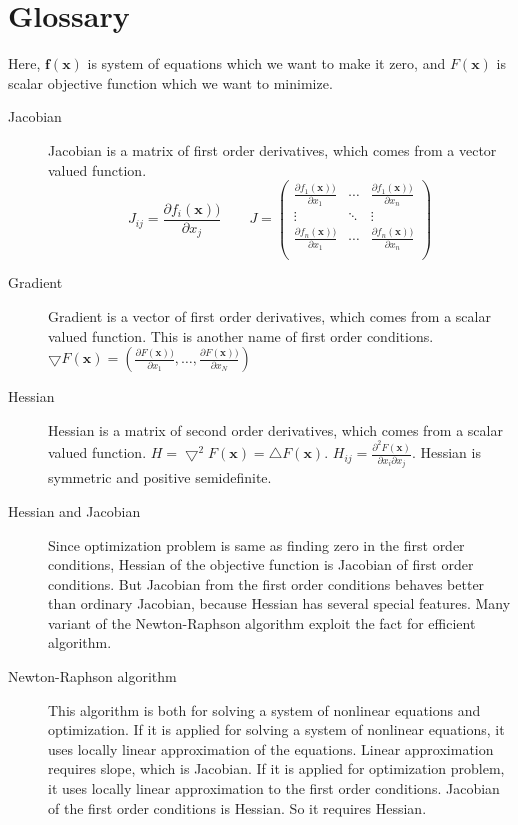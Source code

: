 \documentclass[12pt]{article}
\def\pdiff#1#2{\frac{\partial #1}{\partial #2}}
\def\xb{{\mathbf{x}}}
\def\fb{{\mathbf{f}}}
\begin{document}
\section{Glossary}
Here, $\fb(\xb)$ is system of equations which we want to make it zero, and $F(\xb)$ is scalar
objective function which we want to minimize. 
\begin{description}
	\item[Jacobian] Jacobian is a matrix of first order derivatives, which comes from a vector 
	valued function. \[
	J_{ij} =\pdiff{f_i(\xb))}{x_j}\qquad J = \begin{pmatrix}
	\pdiff{f_1(\xb))}{x_1} & \cdots & \pdiff{f_1(\xb))}{x_n} \\
	\vdots & \ddots & \vdots \\
	\pdiff{f_n(\xb))}{x_1} & \cdots
 & \pdiff{f_n(\xb))}{x_n} \\
	 \end{pmatrix}
	\]
	\item[Gradient] Gradient is a vector of first order derivatives, which comes from a scalar
      valued function. This is another name of first order conditions.  $\bigtriangledown F(\xb) =
      (\pdiff{F(\xb))}{x_1},\dots,\pdiff{F(\xb))}{x_N} )$
	\item[Hessian] Hessian is a matrix of second order derivatives, which comes from a scalar
      valued function.  $H = \bigtriangledown^2 F(\xb) =\bigtriangleup F(\xb)$. $
      H_{ij}=\frac{\partial^2 F(\xb)}{\partial x_i \partial x_j}$. Hessian is symmetric and
      positive semidefinite.  
	\item[Hessian and Jacobian] Since optimization problem is same as finding zero in the first
      order conditions, Hessian of the objective function is Jacobian of first order
      conditions. But Jacobian from the first order conditions behaves better than ordinary
      Jacobian, because Hessian has several special features. Many variant of the Newton-Raphson
      algorithm exploit the fact for efficient algorithm. 
	\item[Newton-Raphson algorithm] This algorithm is both for solving a system of nonlinear
      equations and optimization. If it is applied for solving a system of nonlinear equations, it
      uses locally linear approximation of the equations. Linear approximation requires slope,
      which is Jacobian. If it is applied for optimization problem, it uses locally linear
      approximation to the first order conditions. Jacobian of the first order conditions is
      Hessian. So it requires Hessian.

\end{description}
\end{document}
